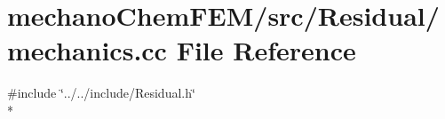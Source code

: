 \section{mechano\-Chem\-F\-E\-M/src/\-Residual/mechanics.cc File Reference}
\label{mechanics_8cc}
{\ttfamily \#include \char`\"{}../../include/\-Residual.\-h\char`\"{}}\\*
